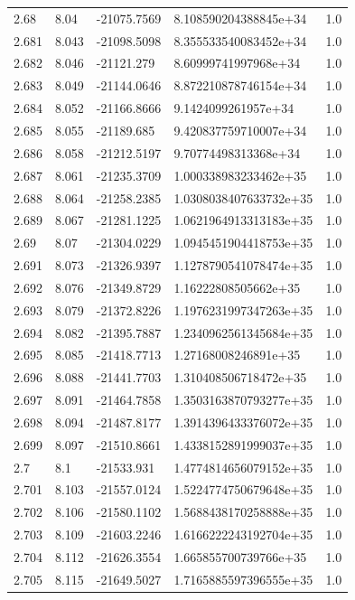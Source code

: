 \begin{tabular}{lllll}
2.68 & 8.04 & -21075.7569 & 8.108590204388845e+34 & 1.0 \\
2.681 & 8.043 & -21098.5098 & 8.355533540083452e+34 & 1.0 \\
2.682 & 8.046 & -21121.279 & 8.60999741997968e+34 & 1.0 \\
2.683 & 8.049 & -21144.0646 & 8.872210878746154e+34 & 1.0 \\
2.684 & 8.052 & -21166.8666 & 9.1424099261957e+34 & 1.0 \\
2.685 & 8.055 & -21189.685 & 9.420837759710007e+34 & 1.0 \\
2.686 & 8.058 & -21212.5197 & 9.70774498313368e+34 & 1.0 \\
2.687 & 8.061 & -21235.3709 & 1.000338983233462e+35 & 1.0 \\
2.688 & 8.064 & -21258.2385 & 1.0308038407633732e+35 & 1.0 \\
2.689 & 8.067 & -21281.1225 & 1.0621964913313183e+35 & 1.0 \\
2.69 & 8.07 & -21304.0229 & 1.0945451904418753e+35 & 1.0 \\
2.691 & 8.073 & -21326.9397 & 1.1278790541078474e+35 & 1.0 \\
2.692 & 8.076 & -21349.8729 & 1.16222808505662e+35 & 1.0 \\
2.693 & 8.079 & -21372.8226 & 1.1976231997347263e+35 & 1.0 \\
2.694 & 8.082 & -21395.7887 & 1.2340962561345684e+35 & 1.0 \\
2.695 & 8.085 & -21418.7713 & 1.27168008246891e+35 & 1.0 \\
2.696 & 8.088 & -21441.7703 & 1.310408506718472e+35 & 1.0 \\
2.697 & 8.091 & -21464.7858 & 1.3503163870793277e+35 & 1.0 \\
2.698 & 8.094 & -21487.8177 & 1.3914396433376072e+35 & 1.0 \\
2.699 & 8.097 & -21510.8661 & 1.4338152891999037e+35 & 1.0 \\
2.7 & 8.1 & -21533.931 & 1.4774814656079152e+35 & 1.0 \\
2.701 & 8.103 & -21557.0124 & 1.5224774750679648e+35 & 1.0 \\
2.702 & 8.106 & -21580.1102 & 1.5688438170258888e+35 & 1.0 \\
2.703 & 8.109 & -21603.2246 & 1.6166222243192704e+35 & 1.0 \\
2.704 & 8.112 & -21626.3554 & 1.665855700739766e+35 & 1.0 \\
2.705 & 8.115 & -21649.5027 & 1.7165885597396555e+35 & 1.0 \\

\end{tabular}
